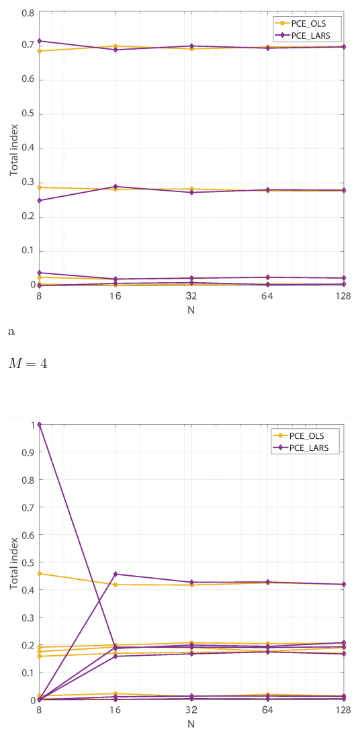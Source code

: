 \documentclass[review]{elsarticle}
\numberwithin{equation}{section}
\numberwithin{equation}{section}
\begin{document}
\begin{figure}[h!]
    \centering
    \begin{subfigure}[t]{0.32\textwidth}
        \centering
        \includegraphics[trim={1cm 0cm 0 0cm},clip, scale=0.22]{convergence_chord1_4.eps}{a}
        \caption{$M=4$}
    \end{subfigure}%
    ~ 
    \begin{subfigure}[t]{0.32\textwidth}
        \centering
        \includegraphics[trim={1cm 0cm 0 0cm},clip, scale=0.22]{convergence_chord1_6.eps}

\end{subfigure}
\end{figure}
\end{document}

